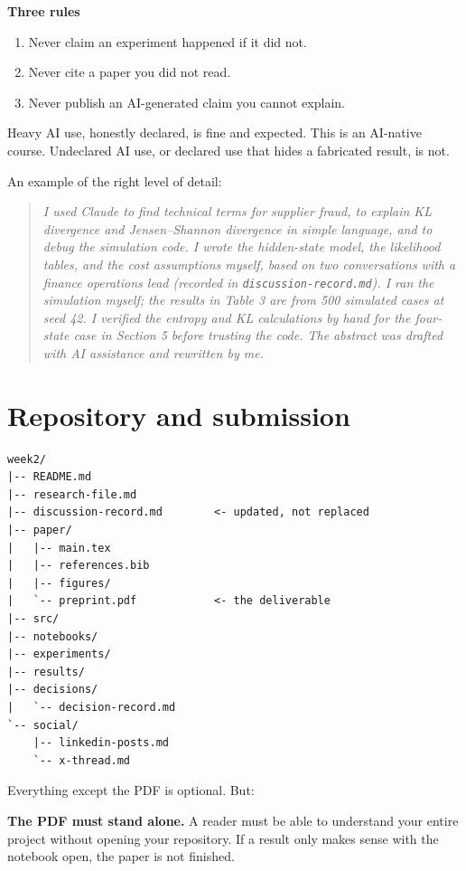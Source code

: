 \documentclass[11pt,a4paper]{article}
\newcommand{\boxtitle}[1]{{\bfseries #1}\par\vspace{2pt}}
\begin{document}
\begin{sbbox}
\boxtitle{Three rules}
\begin{enumerate}
  \item Never claim an experiment happened if it did not.
  \item Never cite a paper you did not read.
  \item Never publish an AI-generated claim you cannot explain.
\end{enumerate}
Heavy AI use, honestly declared, is fine and expected. This is an AI-native course. Undeclared
AI use, or declared use that hides a fabricated result, is not.
\end{sbbox}

An example of the right level of detail:

\begin{quote}\small\itshape
I used Claude to find technical terms for supplier fraud, to explain KL divergence and
Jensen--Shannon divergence in simple language, and to debug the simulation code. I wrote the
hidden-state model, the likelihood tables, and the cost assumptions myself, based on two
conversations with a finance operations lead (recorded in \texttt{discussion-record.md}). I ran
the simulation myself; the results in Table 3 are from 500 simulated cases at seed 42. I verified
the entropy and KL calculations by hand for the four-state case in Section 5 before trusting the
code. The abstract was drafted with AI assistance and rewritten by me.
\end{quote}

\section{Repository and submission}

\begin{verbatim}
week2/
|-- README.md
|-- research-file.md
|-- discussion-record.md        <- updated, not replaced
|-- paper/
|   |-- main.tex
|   |-- references.bib
|   |-- figures/
|   `-- preprint.pdf            <- the deliverable
|-- src/
|-- notebooks/
|-- experiments/
|-- results/
|-- decisions/
|   `-- decision-record.md
`-- social/
    |-- linkedin-posts.md
    `-- x-thread.md
\end{verbatim}

Everything except the PDF is optional. But:

\begin{sbrule}
\textbf{The PDF must stand alone.} A reader must be able to understand your entire project without
opening your repository. If a result only makes sense with the notebook open, the paper is not
finished.
\end{sbrule}
\end{document}
